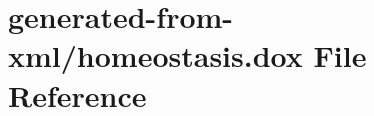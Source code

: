 \hypertarget{homeostasis_8dox}{}\section{generated-\/from-\/xml/homeostasis.dox File Reference}
\label{homeostasis_8dox}
